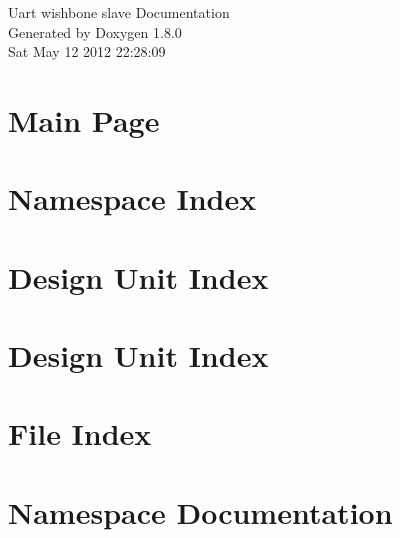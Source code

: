 \documentclass{book}
\begin{document}
\begin{titlepage}
\vspace*{7cm}
\begin{center}
{\Large Uart wishbone slave Documentation }\\
\vspace*{1cm}
{\large Generated by Doxygen 1.8.0}\\
\vspace*{0.5cm}
{\small Sat May 12 2012 22:28:09}\\
\end{center}
\end{titlepage}
\clearemptydoublepage
{}
\tableofcontents
\clearemptydoublepage
{}
\chapter{Main Page}
\label{index}
\chapter{Namespace Index}

\chapter{Design Unit Index}

\chapter{Design Unit Index}

\chapter{File Index}

\chapter{Namespace Documentation}

\end{document}
